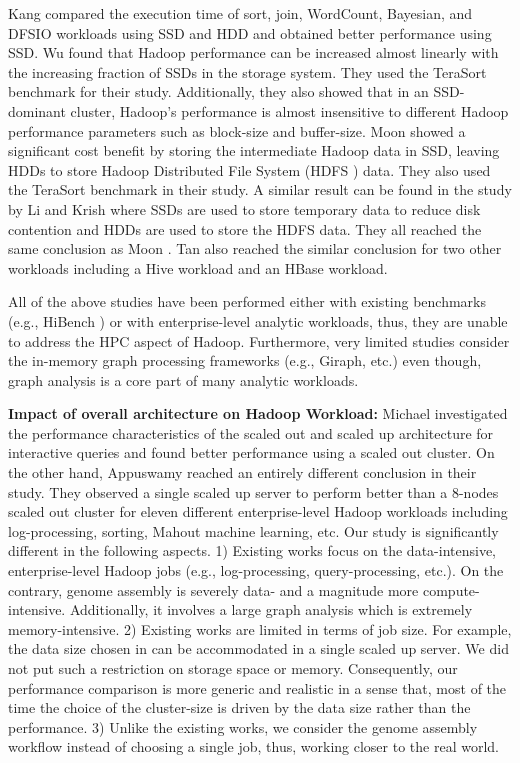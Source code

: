 \documentclass[conference]{IEEEtran}
\begin{document}
Kang \cite{ssdhdd:kang} compared the execution time of sort, join, WordCount, Bayesian, and DFSIO workloads using SSD and HDD and obtained better performance using SSD. Wu \cite{ssdhdd:wu} found that Hadoop performance can be increased almost linearly with the increasing fraction of SSDs in the storage system. They used the TeraSort benchmark for their study. Additionally, they also showed that in an SSD-dominant cluster, Hadoop's performance is almost insensitive to different Hadoop performance parameters such as block-size and buffer-size. Moon \cite{ssdhdd:moon} showed a significant cost benefit by storing the intermediate Hadoop data in SSD, leaving HDDs to store Hadoop Distributed File System (HDFS \cite{fw:hdfs}) data. They also used the TeraSort benchmark in their study. A similar result can be found in the study by Li \cite{ssdhdd:li} and Krish \cite{ssdhdd:krish} where SSDs are used to store temporary data to reduce disk contention and HDDs are used to store the HDFS data. They all reached the same conclusion as Moon \cite{ssdhdd:moon}.  Tan \cite{ssdhdd:tan} also reached the similar conclusion for two other workloads including a Hive workload and an HBase workload. 

All of the above studies have been performed either with existing benchmarks (e.g., HiBench \cite{bm:hibench}) or with enterprise-level analytic workloads, thus, they are unable to address the HPC aspect of Hadoop. Furthermore, very limited studies consider the in-memory graph processing frameworks (e.g., Giraph, etc.) even though, graph analysis is a core part of many analytic workloads.

\textbf{Impact of overall architecture on Hadoop Workload:} 
Michael \cite{scaleupscaleout:michael} investigated the performance characteristics of the scaled out and scaled up architecture for interactive queries and found better performance using a scaled out cluster. On the other hand, Appuswamy \cite{scaleupscaleout:appuswamy} reached an entirely different conclusion in their study. They observed a single scaled up server to perform better than a 8-nodes scaled out cluster for eleven different enterprise-level Hadoop workloads including log-processing, sorting, Mahout machine learning, etc. Our study is significantly different in the following aspects. 
1) Existing works focus on the data-intensive, enterprise-level Hadoop jobs (e.g., log-processing, query-processing, etc.). On the contrary, genome assembly is severely data- and a magnitude more compute-intensive. Additionally, it involves a large graph analysis which is extremely memory-intensive. 
2) Existing works are limited in terms of job size. For example, the data size chosen in \cite{scaleupscaleout:appuswamy} can be accommodated in a single scaled up server. We did not put such a restriction on storage space or memory. Consequently, our performance comparison is more generic and realistic in a sense that, most of the time the choice of the cluster-size is driven by the data size rather than the performance. 
3) Unlike the existing works, we consider the genome assembly workflow instead of choosing a single job, thus, working closer to the real world.
\end{document}
